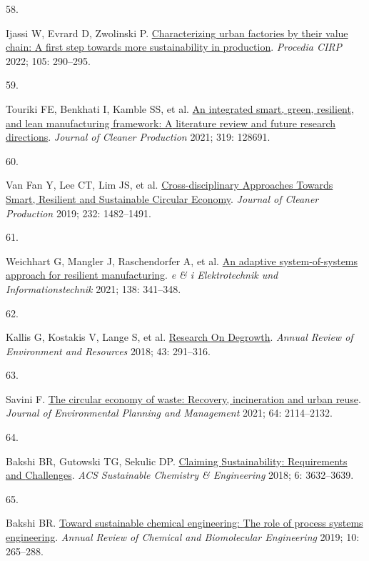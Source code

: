 \documentclass[
  11pt,
  a4paperpaper,
  onecolumn]{article}
\newlength{\cslhangindent}
\newlength{\csllabelwidth}
\newlength{\cslentryspacingunit} %
\newenvironment{CSLReferences}[2] %
 {%
  \setlength{\parindent}{0pt}
  \ifodd #1
  \let\oldpar\par
  \def\par{\hangindent=\cslhangindent\oldpar}
  \fi
  \setlength{\parskip}{#2\cslentryspacingunit}
 }%
 {}
\newcommand{\CSLLeftMargin}[1]{\parbox[t]{\csllabelwidth}{#1}}
\newcommand{\CSLRightInline}[1]{\parbox[t]{\linewidth - \csllabelwidth}{#1}\break}
\begin{document}
\begin{CSLReferences}{0}{0}
\leavevmode{}%
\CSLLeftMargin{58. }%
\CSLRightInline{Ijassi W, Evrard D, Zwolinski P.
\href{https://doi.org/10.1016/j.procir.2022.02.048}{Characterizing urban
factories by their value chain: A first step towards more sustainability
in production}. \emph{Procedia CIRP} 2022; 105: 290--295.}

\leavevmode{}%
\CSLLeftMargin{59. }%
\CSLRightInline{Touriki FE, Benkhati I, Kamble SS, et al.
\href{https://doi.org/10.1016/J.JCLEPRO.2021.128691}{An integrated
smart, green, resilient, and lean manufacturing framework: {A}
literature review and future research directions}. \emph{Journal of
Cleaner Production} 2021; 319: 128691.}

\leavevmode{}%
\CSLLeftMargin{60. }%
\CSLRightInline{Van Fan Y, Lee CT, Lim JS, et al.
\href{https://doi.org/10.1016/j.jclepro.2019.05.266}{Cross-disciplinary
{Approaches Towards Smart}, {Resilient} and {Sustainable Circular
Economy}}. \emph{Journal of Cleaner Production} 2019; 232: 1482--1491.}

\leavevmode{}%
\CSLLeftMargin{61. }%
\CSLRightInline{Weichhart G, Mangler J, Raschendorfer A, et al.
\href{https://doi.org/10.1007/s00502-021-00912-2}{An adaptive
system-of-systems approach for resilient manufacturing}. \emph{e \& i
Elektrotechnik und Informationstechnik} 2021; 138: 341--348.}

\leavevmode{}%
\CSLLeftMargin{62. }%
\CSLRightInline{Kallis G, Kostakis V, Lange S, et al.
\href{https://doi.org/10.1146/annurev-environ-102017-025941}{Research
{On Degrowth}}. \emph{Annual Review of Environment and Resources} 2018;
43: 291--316.}

\leavevmode{}%
\CSLLeftMargin{63. }%
\CSLRightInline{Savini F.
\href{https://doi.org/10.1080/09640568.2020.1857226}{The circular
economy of waste: Recovery, incineration and urban reuse}. \emph{Journal
of Environmental Planning and Management} 2021; 64: 2114--2132.}

\leavevmode{}%
\CSLLeftMargin{64. }%
\CSLRightInline{Bakshi BR, Gutowski TG, Sekulic DP.
\href{https://doi.org/10.1021/acssuschemeng.7b03953}{Claiming
{Sustainability}: {Requirements} and {Challenges}}. \emph{ACS
Sustainable Chemistry \& Engineering} 2018; 6: 3632--3639.}

\leavevmode{}%
\CSLLeftMargin{65. }%
\CSLRightInline{Bakshi BR.
\href{https://doi.org/10.1146/annurev-chembioeng-060718-030332}{Toward
sustainable chemical engineering: {The} role of process systems
engineering}. \emph{Annual Review of Chemical and Biomolecular
Engineering} 2019; 10: 265--288.}


\end{CSLReferences}
\end{document}

